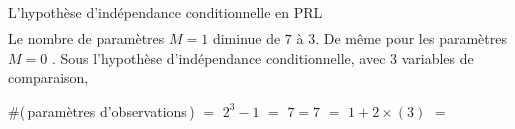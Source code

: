 \begin{frame}{\vskip -0.3cm \large L'hypoth\`ese d'ind\'ependance conditionnelle en PRL}
{\begin{equation*}
\begin{array}{c}
\end{array}
\end{equation*}
}
\pause
\vskip -0.2cm
Le nombre de param\`etres \og $M=1$ \fg\;diminue {\color{red}de $7$ \`a $3$}.
\; De m\^eme pour les param\`etres \og $M=0$ \fg.
\pause
\; Sous l'hypoth\`ese d'ind\'ependance conditionnelle,
\pause
avec 3 variables de comparaison,
\pause
\begin{center}
\vskip 0.03cm
\#(\,param\`etres d'observations\,) $=$ $2^{3}-1$ $=$
\;\textbf{\normalsize\color{red}$7$}\pause\textbf{\normalsize\color{red}\;$=$\;$7$}\;
$=$ $1+2 \times\!(3)$ $=$ 
\end{center}

\end{frame}
\normalsize

